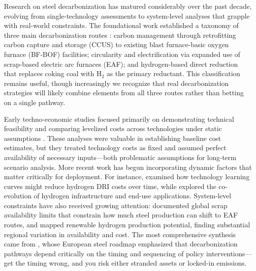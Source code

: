 \documentclass[preprint,1p,authoryear]{elsarticle}
\begin{document}
Research on steel decarbonization has matured considerably over the past decade, evolving from single-technology assessments to system-level analyses that grapple with real-world constraints. The foundational work established a taxonomy of three main decarbonization routes \citep{IEA2020steel}: carbon management through retrofitting carbon capture and storage (CCUS) to existing blast furnace-basic oxygen furnace (BF-BOF) facilities; circularity and electrification via expanded use of scrap-based electric arc furnaces (EAF); and hydrogen-based direct reduction that replaces coking coal with H$_2$ as the primary reductant. This classification remains useful, though increasingly we recognize that real decarbonization strategies will likely combine elements from all three routes rather than betting on a single pathway.

Early techno-economic studies focused primarily on demonstrating technical feasibility and comparing levelized costs across technologies under static assumptions \citep{Vogl2018, Otto2017}. These analyses were valuable in establishing baseline cost estimates, but they treated technology costs as fixed and assumed perfect availability of necessary inputs—both problematic assumptions for long-term scenario analysis. More recent work has begun incorporating dynamic factors that matter critically for deployment. For instance, \citet{prammer2021steel} examined how technology learning curves might reduce hydrogen DRI costs over time, while \citet{ueckerdt2021potential} explored the co-evolution of hydrogen infrastructure and end-use applications. System-level constraints have also received growing attention: \citet{pauliuk2013global} documented global scrap availability limits that constrain how much steel production can shift to EAF routes, and \citet{wang2021hydrogen} mapped renewable hydrogen production potential, finding substantial regional variation in availability and cost. The most comprehensive synthesis came from \citet{MaterialEconomics2019}, whose European steel roadmap emphasized that decarbonization pathways depend critically on the timing and sequencing of policy interventions—get the timing wrong, and you risk either stranded assets or locked-in emissions.
\end{document}
